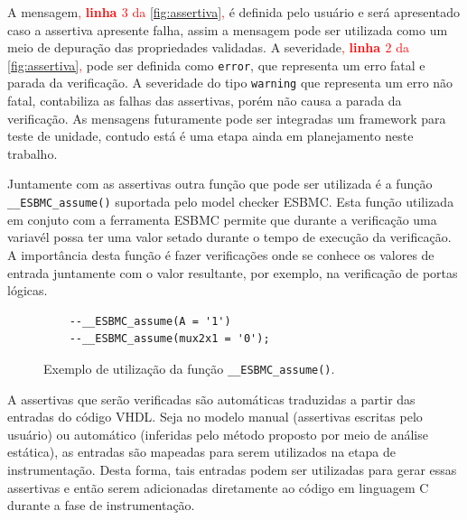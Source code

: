 \par
A mensagem\textcolor{red}{, \textbf{linha $3$} da \autoref{fig:assertiva},} é definida pelo usuário e será apresentado caso a assertiva apresente falha, assim a mensagem pode ser utilizada como um meio de depuração das propriedades validadas. A severidade\textcolor{red}{, \textbf{linha $2$} da \autoref{fig:assertiva},} pode ser definida como \texttt{error}, que representa um erro fatal e parada da verificação. A severidade do tipo \texttt{warning} que representa um erro não fatal, contabiliza as falhas das assertivas, porém não causa a parada da verificação.
% 
As mensagens futuramente pode ser integradas um framework para teste de unidade, contudo está é uma etapa ainda em planejamento neste trabalho.

\par

\par
Juntamente com as assertivas outra função que pode ser utilizada é a função \texttt{\_\_ESBMC\allowbreak{}\_assume()} suportada pelo model checker ESBMC. Esta função utilizada em conjuto com a ferramenta ESBMC permite que durante a verificação uma variavél possa ter uma valor setado durante o tempo de execução da verificação. A importância desta função é fazer verificações onde se conhece os valores de entrada juntamente com o valor resultante, por exemplo, na verificação de portas lógicas.

\begin{figure}[H]
\caption{\label{fig:assertiva_assume} Exemplo de utilização da função \texttt{\_\_ESBMC\_assume()}.}
	\begin{center}
    \begin{minipage}{0.99\textwidth}
    \begin{lstlisting}       
    --__ESBMC_assume(A = '1')
    --__ESBMC_assume(mux2x1 = '0');
    \end{lstlisting}
    \end{minipage}
	\end{center}
\end{figure}

\par
A assertivas que serão verificadas são automáticas traduzidas a partir das entradas do código VHDL. Seja no modelo manual (assertivas escritas pelo usuário) ou automático (inferidas pelo método proposto por meio de análise estática), as entradas são mapeadas para serem utilizados na etapa de instrumentação. Desta forma, tais entradas podem ser utilizadas para gerar essas assertivas e então serem adicionadas diretamente ao código em linguagem C durante a fase de instrumentação. 

